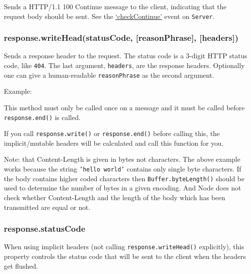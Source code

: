 Sends a HTTP/1.1 100 Continue message to the client, indicating that the
request body should be sent. See the
\hyperref[http_event_checkcontinue]{`checkContinue'} event on
\texttt{Server}.

\subsubsection{response.writeHead(statusCode, {[}reasonPhrase{]},
{[}headers{]})}

Sends a response header to the request. The status code is a 3-digit
HTTP status code, like \texttt{404}. The last argument,
\texttt{headers}, are the response headers. Optionally one can give a
human-readable \texttt{reasonPhrase} as the second argument.

Example:

\begin{Shaded}
\begin{Highlighting}[]
 \NormalTok{;}
\NormalTok{(}\NormalTok{, \{}
  \NormalTok{: }\NormalTok{,}
  \NormalTok{: } \NormalTok{\});}
\end{Highlighting}
\end{Shaded}

This method must only be called once on a message and it must be called
before \texttt{response.end()} is called.

If you call \texttt{response.write()} or \texttt{response.end()} before
calling this, the implicit/mutable headers will be calculated and call
this function for you.

Note: that Content-Length is given in bytes not characters. The above
example works because the string \texttt{'hello world'} contains only
single byte characters. If the body contains higher coded characters
then \texttt{Buffer.byteLength()} should be used to determine the number
of bytes in a given encoding. And Node does not check whether
Content-Length and the length of the body which has been transmitted are
equal or not.

\subsubsection{response.statusCode}

When using implicit headers (not calling \texttt{response.writeHead()}
explicitly), this property controls the status code that will be sent to
the client when the headers get flushed.

